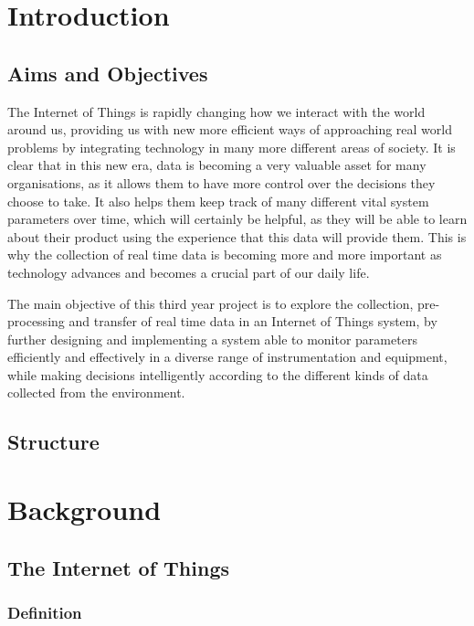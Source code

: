 \documentclass[12pt]{article}
\begin{document}
\tableofcontents
\newpage

\section{Introduction}

\subsection{Aims and Objectives}

The Internet of Things is rapidly changing how we interact with the world around us, providing us with new more efficient ways of approaching real world problems by integrating technology in many more different areas of society. It is clear that in this new era, data is becoming a very valuable asset for many organisations, as it allows them to have more control over the decisions they choose to take. It also helps them keep track of many different vital system parameters over time, which will certainly be helpful, as they will be able to learn about their product using the experience that this data will provide them. This is why the collection of real time data is becoming more and more important as technology advances and becomes a crucial part of our daily life.\par 

The main objective of this third year project is to explore the collection, pre-processing and transfer of real time data in an Internet of Things system, by further designing and implementing a system able to monitor parameters efficiently and effectively in a diverse range of instrumentation and equipment, while making decisions intelligently according to the different kinds of data collected from the environment. 

\subsection{Structure} 

\section{Background}
\subsection{The Internet of Things}

\subsubsection{Definition}
\end{document}
